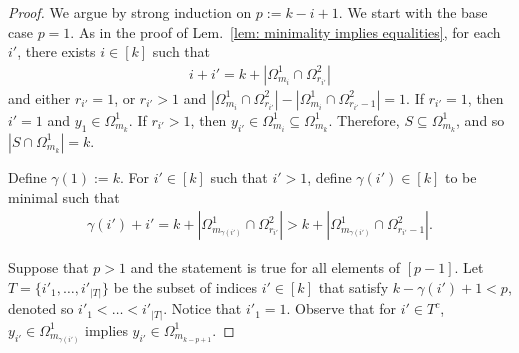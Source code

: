 \documentclass[10pt,a4paper]{amsart}
\newcommand{\Og}{\Omega}
\newcommand{\ga}{\gamma}
\begin{document}
\begin{proof}
We argue by strong induction on \(p := k - i +1\). We start with the base case \(p=1\). As in the proof of Lem.~\ref{lem: minimality implies equalities}, for each \(i'\), there exists \(i \in [k]\) such that 
\begin{gather}
 i + i' = k + | \Og^1_{m_i} \cap \Og^2_{r_{i'}}|   
\end{gather}
and either \(r_{i'} = 1\), or \(r_{i'} > 1\) and \(| \Og^1_{m_i} \cap \Og^2_{r_{i'}}| -  | \Og^1_{m_i} \cap \Og^2_{r_{i'}-1}| = 1\). If \(r_{i'} = 1\), then \(i'=1\) and \(y_{1} \in \Og^1_{m_k}\). If \(r_{i'} > 1\), then \(y_{i'} \in \Og^1_{m_{i}} \subseteq \Og^1_{m_k}\). Therefore, \(S \subseteq \Og^1_{m_k}\), and so \(| S \cap \Og^1_{m_k}| = k\).






Define \(\ga(1) := k\). For \(i' \in [k]\) such that \(i' > 1\), define \(\ga(i') \in [k]\) to be minimal such that 
\begin{gather}
\ga(i') + i' = k + | \Og^1_{m_{\ga(i')}} \cap \Og^2_{r_{i'}}| > k + | \Og^1_{m_{\ga(i')}} \cap \Og^2_{r_{i'}-1}|.
\end{gather}


Suppose that \(p > 1\) and the statement is true for all elements of \([p-1]\). Let \(T = \{ i'_1, \ldots, i'_{|T|}\}\) be the subset of indices \(i' \in [k]\) that satisfy \(k-\ga(i')+1 < p\), denoted so \(i'_1 < \ldots < i'_{|T|}\). Notice that \(i'_1 = 1\). Observe that for \(i' \in T^c\), \(y_{i'} \in \Og^1_{m_{\ga(i')}}\) implies   \(y_{i'} \in \Og^1_{m_{k-p+1}}\). 


\end{proof}
\end{document}

